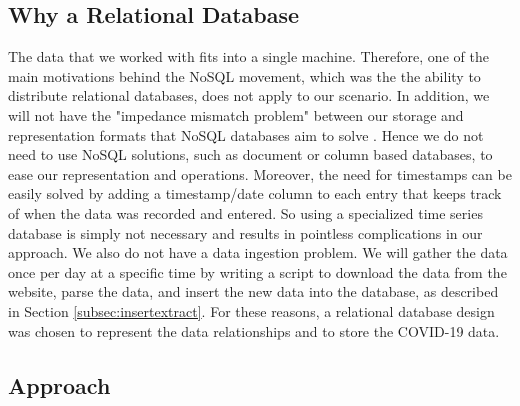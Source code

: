 \documentclass[11pt]{article}
\begin{document}
\subsection{Why a Relational Database}
\label{subsec:why}


\noindent
The data that we worked with fits into a single machine. Therefore, one of the main motivations behind the NoSQL movement, which was the the ability to distribute relational databases, does not apply to our scenario. In addition, we will not have the "impedance mismatch problem" between our storage and representation formats that NoSQL databases aim to solve \cite{nosqlTalk}. Hence we do not need to use NoSQL solutions, such as document or column based databases, to ease our representation and operations. Moreover, the need for timestamps can be easily solved by adding a timestamp/date column to each entry that keeps track of when the data was recorded and entered. So using a specialized time series database is simply not necessary and results in pointless complications in our approach. We also do not have a data ingestion problem. We will gather the data once per day at a specific time by writing a script to download the data from the website, parse the data, and insert the new data into the database, as described in Section \ref{subsec:insertextract}. For these reasons, a relational database design was chosen to represent the data relationships and to store the COVID-19 data. \\


\subsection{Approach}
\label{subsec:approach}
\end{document}
